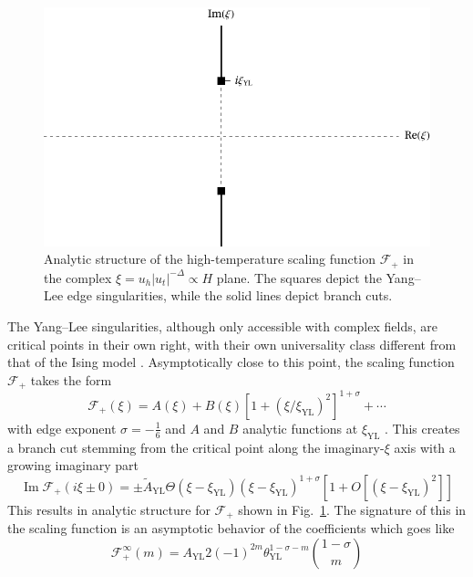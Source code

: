 \documentclass[
aps,
pre,
preprint,
longbibliography,
floatfix
]{revtex4-2}
\begin{document}
\begin{figure}
  \includegraphics{figs/F_higher_singularities.pdf}
  \caption{
    Analytic structure of the high-temperature scaling function $\mathcal F_+$
    in the complex $\xi=u_h|u_t|^{-\Delta}\propto H$ plane. The squares
    depict the Yang--Lee edge singularities, while the solid lines depict
    branch cuts.
  } \label{fig:higher.singularities}
\end{figure}

The Yang--Lee singularities, although only accessible with complex fields, are
critical points in their own right, with their own universality class different
from that of the Ising model \cite{Fisher_1978_Yang-Lee}. Asymptotically close
to this point, the scaling function $\mathcal F_+$ takes the form
\begin{equation} \label{eq:yang.lee.sing}
  \mathcal F_+(\xi)
  =A(\xi) +B(\xi)[1+(\xi/\xi_{\mathrm{YL}})^2]^{1+\sigma}+\cdots
\end{equation}
with edge exponent $\sigma=-\frac16$ and $A$ and $B$ analytic functions at
$\xi_\mathrm{YL}$ \cite{Cardy_1985_Conformal, Fonseca_2003_Ising}. This creates
a branch cut stemming from the critical point along the imaginary-$\xi$ axis
with a growing imaginary part
\begin{equation}
  \operatorname{Im}\mathcal F_+(i\xi\pm0)=\pm\tilde A_\mathrm{YL}\Theta(\xi-\xi_\mathrm{YL})(\xi-\xi_\mathrm{YL})^{1+\sigma}[1+O[(\xi-\xi_\mathrm{YL})^2]]
\end{equation}
This results in analytic structure for $\mathcal F_+$ shown in
Fig.~\ref{fig:higher.singularities}. The signature of this in the scaling
function is an asymptotic behavior of the coefficients which goes like
\begin{equation} \label{eq:high.asymptotic}
  \mathcal F_+^\infty(m)=A_\mathrm{YL}2(-1)^{2m}\theta_\mathrm{YL}^{1-\sigma-m}\binom{1-\sigma}{m}
\end{equation}
\end{document}
